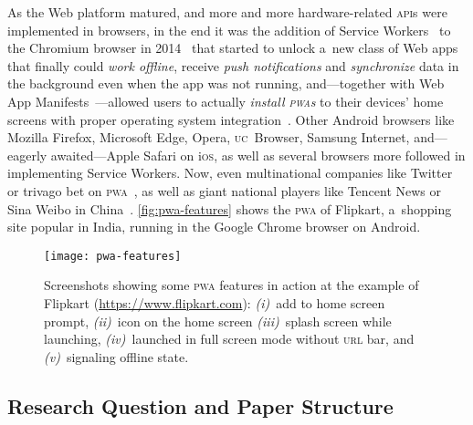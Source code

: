 \documentclass[sigconf,hyphens]{acmart}
\begin{document}
As the Web platform matured, and more and more
hardware-related \textsc{api}s were implemented in browsers,
in the end it was the addition of Service Workers~\cite{russell2017serviceworkers}
to the Chromium browser in 2014~\cite{cooney2014chromium} that started to unlock a~new class of Web apps
that finally could \emph{work offline}, receive \emph{push notifications}
and \emph{synchronize} data in the background even when the app was not running,
and---together with Web App Manifests~\cite{caceres2017manifest}---allowed
users to actually \emph{install \textsc{pwa}s} to their devices' home screens
with proper operating system integration~\cite{kinlan2017a2hs}.
Other Android browsers like Mozilla Firefox, Microsoft Edge, Opera, \textsc{uc}~Browser, Samsung Internet,
and---eagerly awaited---Apple Safari on i\textsc{os},
as well as several browsers more followed in implementing Service Workers.
Now, even multinational companies like Twitter
or trivago bet on \textsc{pwa}~\cite{gallagher2017twitterlite,twg2017trivago},
as well as giant national players like Tencent News or Sina Weibo in China~\cite{zhu2017pwa}.
\autoref{fig:pwa-features} shows the \textsc{pwa} of Flipkart, a~shopping site popular in India,
running in the Google Chrome browser on Android.

\begin{figure}[hbt]
  \centering
  \texttt{[image: pwa-features]}
  \caption[Screenshots showing some \textsc{pwa} features]{
    Screenshots showing some \textsc{pwa} features in action
    at the example of Flipkart (\url{https://www.flipkart.com}):
    \emph{(i)}~add to home screen prompt, \emph{(ii)}~icon on the home screen
    \emph{(iii)}~splash screen while launching,
    \emph{(iv)}~launched in full screen mode without \textsc{url} bar, and
    \emph{(v)}~signaling offline state.}
  \label{fig:pwa-features}
\end{figure}

\subsection{Research Question and Paper Structure}
\end{document}
